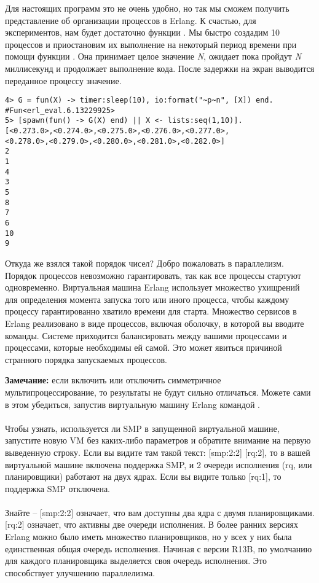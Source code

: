 Для настоящих программ это не очень удобно, но так мы сможем получить представление об организации процессов в Erlang.
К счастью, для экспериментов, нам будет достаточно функции .
Мы быстро создадим 10 процессов и приостановим их выполнение на некоторый период времени при помощи функции .
Она  принимает целое значение \emph{N}, ожидает пока пройдут \emph{N} миллисекунд и продолжает выполнение кода.
После задержки на экран выводится переданное процессу значение.
\begin{lstlisting}[style=erlang]
4> G = fun(X) -> timer:sleep(10), io:format("~p~n", [X]) end.
#Fun<erl_eval.6.13229925>
5> [spawn(fun() -> G(X) end) || X <- lists:seq(1,10)].
[<0.273.0>,<0.274.0>,<0.275.0>,<0.276.0>,<0.277.0>,
<0.278.0>,<0.279.0>,<0.280.0>,<0.281.0>,<0.282.0>]
2  
1  
4  
3  
5  
8  
7  
6  
10 
9 
\end{lstlisting}

Откуда же взялся такой порядок чисел?
Добро пожаловать в параллелизм.
Порядок процессов невозможно гарантировать, так как все процессы стартуют одновременно.
Виртуальная машина Erlang использует множество ухищрений для определения момента запуска того или иного процесса, чтобы каждому процессу гарантированно хватило времени для старта.
Множество сервисов в Erlang реализовано в виде процессов, включая оболочку, в которой вы вводите команды.
Системе приходится балансировать между вашими процессами и процессами, которые необходимы ей самой.
Это может явиться причиной странного порядка запускаемых процессов.\\
\colorbox{lgray}
{
\begin{minipage}{1.0\linewidth}
    \textbf{Замечание:} если включить или отключить симметричное мультипроцессирование, то результаты не будут сильно отличаться.
    Можете сами в этом убедиться, запустив виртуальную машину Erlang командой .\\
    \\
    Чтобы узнать, используется ли SMP в запущенной виртуальной машине, запустите новую VM без каких\--либо параметров и обратите внимание на первую выведенную строку.
    Если вы видите там такой текст: [smp:2:2] [rq:2], то в вашей виртуальной машине включена поддержка SMP, и 2 очереди исполнения (rq, или планировщики) работают на двух ядрах.
    Если вы видите только [rq:1], то поддержка SMP отключена.\\
    \\
    Знайте \--- [smp:2:2] означает, что вам доступны два ядра с двумя планировщиками.
    [rq:2] означает, что активны две очереди исполнения.
    В более ранних версиях Erlang можно было иметь множество планировщиков, но у всех у них была единственная общая очередь исполнения.
    Начиная с версии R13B, по умолчанию для каждого планировщика выделяется своя очередь исполнения.
    Это способствует улучшению параллелизма.
\end{minipage}
}


